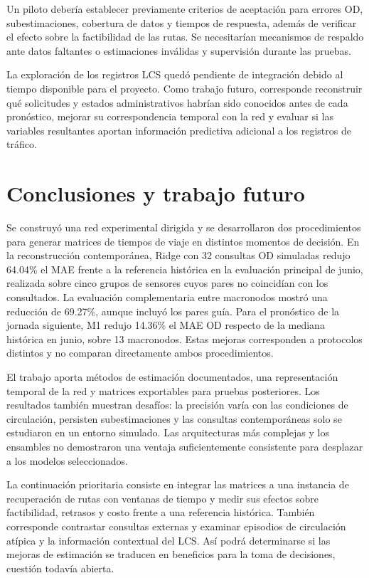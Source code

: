\documentclass[letterpaper,11pt]{article}
\begin{document}
Un piloto debería establecer previamente criterios de aceptación para errores OD, subestimaciones, cobertura de datos y tiempos de respuesta, además de verificar el efecto sobre la factibilidad de las rutas. Se necesitarían mecanismos de respaldo ante datos faltantes o estimaciones inválidas y supervisión durante las pruebas.

La exploración de los registros LCS quedó pendiente de integración debido al tiempo disponible para el proyecto. Como trabajo futuro, corresponde reconstruir qué solicitudes y estados administrativos habrían sido conocidos antes de cada pronóstico, mejorar su correspondencia temporal con la red y evaluar si las variables resultantes aportan información predictiva adicional a los registros de tráfico.


\section{Conclusiones y trabajo futuro}
Se construyó una red experimental dirigida y se desarrollaron dos procedimientos para generar matrices de tiempos de viaje en distintos momentos de decisión. En la reconstrucción contemporánea, Ridge con 32 consultas OD simuladas redujo 64.04\% el MAE frente a la referencia histórica en la evaluación principal de junio, realizada sobre cinco grupos de sensores cuyos pares no coincidían con los consultados. La evaluación complementaria entre macronodos mostró una reducción de 69.27\%, aunque incluyó los pares guía. Para el pronóstico de la jornada siguiente, M1 redujo 14.36\% el MAE OD respecto de la mediana histórica en junio, sobre 13 macronodos. Estas mejoras corresponden a protocolos distintos y no comparan directamente ambos procedimientos.

El trabajo aporta métodos de estimación documentados, una representación temporal de la red y matrices exportables para pruebas posteriores. Los resultados también muestran desafíos: la precisión varía con las condiciones de circulación, persisten subestimaciones y las consultas contemporáneas solo se estudiaron en un entorno simulado. Las arquitecturas más complejas y los ensambles no demostraron una ventaja suficientemente consistente para desplazar a los modelos seleccionados.

La continuación prioritaria consiste en integrar las matrices a una instancia de recuperación de rutas con ventanas de tiempo y medir sus efectos sobre factibilidad, retrasos y costo frente a una referencia histórica. También corresponde contrastar consultas externas y examinar episodios de circulación atípica y la información contextual del LCS. Así podrá determinarse si las mejoras de estimación se traducen en beneficios para la toma de decisiones, cuestión todavía abierta.
\end{document}
